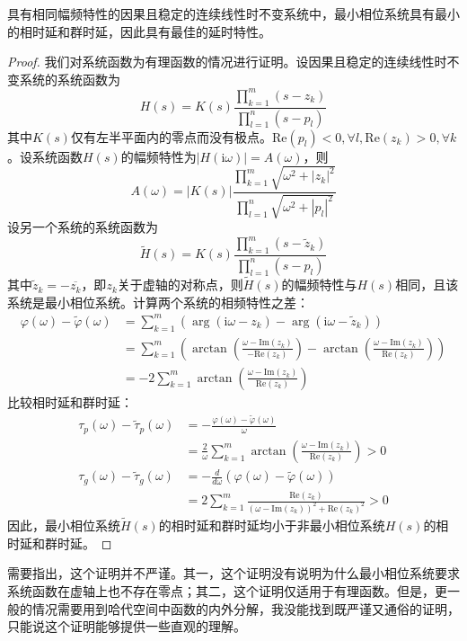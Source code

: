 \documentclass{ctexbook}
\begin{document}
\begin{proposition}
    具有相同幅频特性的因果且稳定的连续线性时不变系统中，最小相位系统具有最小的相时延和群时延，因此具有最佳的延时特性。
\end{proposition}
\begin{proof}
    我们对系统函数为有理函数的情况进行证明。设因果且稳定的连续线性时不变系统的系统函数为
    \[H(s)=K(s)\frac{\prod_{k=1}^{m}(s-z_k)}{\prod_{l=1}^{n}(s-p_l)}\]
    其中$K(s)$仅有左半平面内的零点而没有极点。$\text{Re}(p_l)<0,\forall l,\text{Re}(z_k)> 0,\forall k$。设系统函数$H(s)$的幅频特性为$|H(\mathrm{i}\omega)|=A(\omega)$，则
    \[A(\omega)=|K(s)|\frac{\prod_{k=1}^{m}\sqrt{\omega^2+|z_k|^2}}{\prod_{l=1}^{n}\sqrt{\omega^2+|p_l|^2}}\]
    设另一个系统的系统函数为
    \[\tilde{H}(s)=K(s)\frac{\prod_{k=1}^{m}(s-\tilde{z}_k)}{\prod_{l=1}^{n}(s-p_l)}\]
    其中$\tilde{z}_k=-\overline{z_k}$，即$z_k$关于虚轴的对称点，则$\tilde{H}(s)$的幅频特性与$H(s)$相同，且该系统是最小相位系统。计算两个系统的相频特性之差：
    \begin{align*}
        \varphi(\omega)-\tilde{\varphi}(\omega)&=\sum_{k=1}^{m}\left(\arg(\mathrm{i}\omega-z_k)-\arg(\mathrm{i}\omega-\tilde{z}_k)\right)\\
        &=\sum_{k=1}^{m}\left(\arctan\left(\frac{\omega-\text{Im}(z_k)}{-\text{Re}(z_k)}\right)-\arctan\left(\frac{\omega-\text{Im}(z_k)}{\text{Re}(z_k)}\right)\right)\\
        &=-2\sum_{k=1}^{m}\arctan\left(\frac{\omega-\text{Im}(z_k)}{\text{Re}(z_k)}\right)
    \end{align*}
    比较相时延和群时延：
    \begin{align*}
        \tau_p(\omega)-\tilde{\tau}_p(\omega)&=-\frac{\varphi(\omega)-\tilde{\varphi}(\omega)}{\omega}\\
        &=\frac{2}{\omega}\sum_{k=1}^{m}\arctan\left(\frac{\omega-\text{Im}(z_k)}{\text{Re}(z_k)}\right)>0\\
        \tau_g(\omega)-\tilde{\tau}_g(\omega)&=-\frac{d}{d\omega}(\varphi(\omega)-\tilde{\varphi}(\omega))\\
        &=2\sum_{k=1}^{m}\frac{\text{Re}(z_k)}{(\omega-\text{Im}(z_k))^2+\text{Re}(z_k)^2}>0
    \end{align*}
    因此，最小相位系统$\tilde{H}(s)$的相时延和群时延均小于非最小相位系统$H(s)$的相时延和群时延。
\end{proof}

需要指出，这个证明并不严谨。其一，这个证明没有说明为什么最小相位系统要求系统函数在虚轴上也不存在零点；其二，这个证明仅适用于有理函数。但是，更一般的情况需要用到哈代空间中函数的内外分解，我没能找到既严谨又通俗的证明，只能说这个证明能够提供一些直观的理解。
\end{document}
